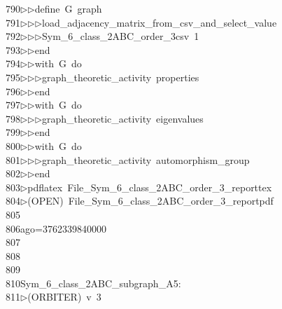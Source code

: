 \begin{tabbing}
790\>$\triangleright$\>$\triangleright$\>define\ G\ graph\ \\[0pt]
791\>$\triangleright$\>$\triangleright$\>$\triangleright$\>load\_adjacency\_matrix\_from\_csv\_and\_select\_value\ \\[0pt]
792\>$\triangleright$\>$\triangleright$\>$\triangleright$\>Sym\_6\_class\_2ABC\_order\_3csv\ 1\ \\[0pt]
793\>$\triangleright$\>$\triangleright$\>end\ \\[0pt]
794\>$\triangleright$\>$\triangleright$\>with\ G\ do\ \\[0pt]
795\>$\triangleright$\>$\triangleright$\>$\triangleright$\>graph\_theoretic\_activity\ properties\ \\[0pt]
796\>$\triangleright$\>$\triangleright$\>end\ \\[0pt]
797\>$\triangleright$\>$\triangleright$\>with\ G\ do\ \\[0pt]
798\>$\triangleright$\>$\triangleright$\>$\triangleright$\>graph\_theoretic\_activity\ eigenvalues\ \\[0pt]
799\>$\triangleright$\>$\triangleright$\>end\ \\[0pt]
800\>$\triangleright$\>$\triangleright$\>with\ G\ do\ \\[0pt]
801\>$\triangleright$\>$\triangleright$\>$\triangleright$\>graph\_theoretic\_activity\ automorphism\_group\ \\[0pt]
802\>$\triangleright$\>$\triangleright$\>end\\[0pt]
803\>$\triangleright$\>pdflatex\ File\_Sym\_6\_class\_2ABC\_order\_3\_reporttex\\[0pt]
804\>$\triangleright$\>(OPEN)\ File\_Sym\_6\_class\_2ABC\_order\_3\_reportpdf\\[0pt]
805\>\\[0pt]
806\>ago=3762339840000\\[0pt]
807\>\\[0pt]
808\>\\[0pt]
809\>\\[0pt]
810\>Sym\_6\_class\_2ABC\_subgraph\_A5:\\[0pt]
811\>$\triangleright$\>(ORBITER)\ v\ 3\ \\[0pt]

\end{tabbing}
